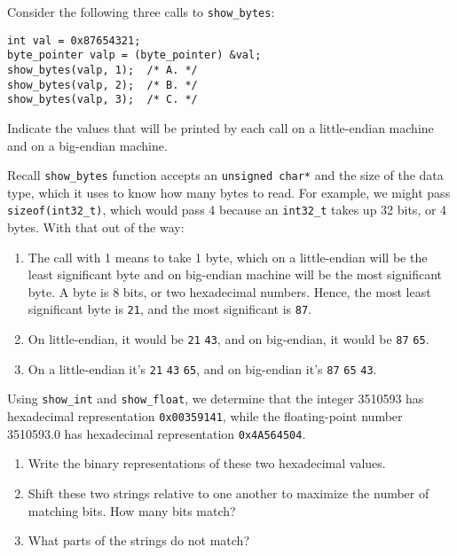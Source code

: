 \documentclass[12pt]{article}
\newenvironment{ex}[2][Exercise]{\begin{trivlist}
		\item[\hskip \labelsep {\bfseries #1}\hskip \labelsep {\bfseries #2.}]}{\end{trivlist}}
\newenvironment{sol}[1][Solution]{\begin{trivlist}
		\item[\hskip \labelsep {\bfseries #1:}]}{\end{trivlist}}
\begin{document}
\begin{ex}{2.5}
	Consider the following three calls to \texttt{show\_bytes}:
\begin{lstlisting}
int val = 0x87654321;
byte_pointer valp = (byte_pointer) &val;
show_bytes(valp, 1);  /* A. */
show_bytes(valp, 2);  /* B. */
show_bytes(valp, 3);  /* C. */
\end{lstlisting}
	Indicate the values that will be printed by each call on a little-endian
	machine and on a big-endian machine.
\end{ex}

\begin{sol}
	Recall \texttt{show\_bytes} function accepts an \texttt{unsigned char*} and
	the size of the data type, which it uses to know how many bytes to read.
	For example, we might pass \texttt{sizeof(int32\_t)}, which would pass
	4 because an \texttt{int32\_t} takes up 32 bits, or 4 bytes. With
	that out of the way:
	\begin{enumerate}[label=(\alph*)]
		\item The call with 1 means to take 1 byte, which on a little-endian will be
		the least significant byte and on big-endian machine will be the most
		significant byte. A byte is 8 bits, or two hexadecimal numbers. Hence,
		the most least significant byte is \texttt{21}, and the most significant is
		\texttt{87}.
		\item On little-endian, it would be \texttt{21} \texttt{43}, and on
		big-endian, it would be \texttt{87} \texttt{65}.
		\item On a little-endian it's \texttt{21} \texttt{43} \texttt{65}, and
		on big-endian it's \texttt{87} \texttt{65} \texttt{43}.
	\end{enumerate}
\end{sol}

\begin{ex}{2.6}
	Using \texttt{show\_int} and \texttt{show\_float}, we determine that the integer
	3510593 has hexadecimal representation \texttt{0x00359141}, while the
	floating-point number 3510593.0 has hexadecimal representation \texttt{0x4A564504}.
	\begin{enumerate}[label=(\alph*)]
		\item Write the binary representations of these two hexadecimal values.
		\item Shift these two strings relative to one another to maximize the number of
		matching bits. How many bits match?
		\item What parts of the strings do not match?
	\end{enumerate}
\end{ex}
\end{document}
